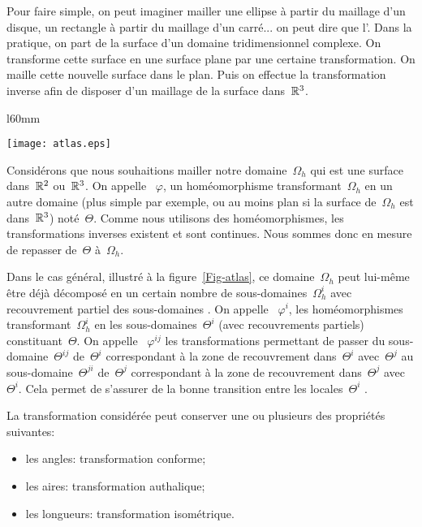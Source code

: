 Pour faire simple, on peut imaginer mailler une ellipse à partir du maillage d'un disque, un rectangle à partir du maillage d'un carré... on peut dire que l'.
Dans la pratique, on part de la surface d'un domaine tridimensionnel complexe. On transforme cette surface en une surface plane par une certaine transformation. On maille cette nouvelle surface dans le plan. Puis on effectue la transformation inverse afin de disposer d'un maillage de la surface dans~$\mathbb R^3$.

\medskip
\begin{wrapfigure}{l}{60mm}
\begin{center}
\texttt{[image: atlas.eps]}
\end{center}
\caption{Domaines et transformations}\label{Fig-atlas}
\end{wrapfigure}
Considérons que nous souhaitions mailler notre domaine~$\Omega_h$ qui est une surface dans~$\mathbb R^2$ ou~$\mathbb R^3$.
On appelle ~$\varphi$, un homéomorphisme transformant~$\Omega_h$ en un autre domaine (plus simple par exemple, ou au moins plan si la surface de~$\Omega_h$ est dans~$\mathbb R^3$) noté~$\Theta$.
Comme nous utilisons des homéomorphismes, les transformations inverses existent et sont continues. Nous sommes donc en mesure de repasser de~$\Theta$ à~$\Omega_h$.

Dans le cas général, illustré à la figure~\ref{Fig-atlas}, ce domaine~$\Omega_h$ peut lui-même être déjà décomposé en un certain nombre de sous-domaines~$\Omega_h^i$ avec recouvrement partiel des sous-domaines .
On appelle ~$\varphi^i$, les homéomorphismes transformant~$\Omega_h^i$ en les sous-domaines~$\Theta^i$ (avec recouvrements partiels) constituant~$\Theta$.
On appelle ~$\varphi^{ij}$ les transformations permettant de passer du sous-domaine~$\Theta^{ij}$ de~$\Theta^i$ correspondant à la zone de recouvrement dans~$\Theta^i$ avec~$\Theta^j$ au sous-domaine~$\Theta^{ji}$ de~$\Theta^j$ correspondant à la zone de recouvrement dans~$\Theta^j$ avec~$\Theta^i$. Cela permet de s'assurer de la bonne transition entre les  locales~$\Theta^{i}$ .

\medskip
La transformation considérée peut conserver une ou plusieurs des propriétés suivantes:
\begin{itemize}
   \item les angles: transformation conforme;
   \item les aires: transformation authalique;
   \item les longueurs: transformation isométrique.
\end{itemize}

